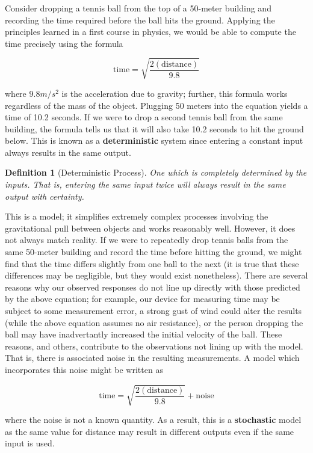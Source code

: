 \documentclass[
]{book}
\theoremstyle{plain}
\theoremstyle{mydefn}
\newtheorem{definition}{Definition}[chapter]
\theoremstyle{myexmpl}
\theoremstyle{remark}
\begin{document}
Consider dropping a tennis ball from the top of a 50-meter building and recording the time required before the ball hits the ground. Applying the principles learned in a first course in physics, we would be able to compute the time precisely using the formula

\[\text{time} = \sqrt{\frac{2(\text{distance})}{9.8}}\]

where \(9.8 m/s^2\) is the acceleration due to gravity; further, this formula works regardless of the mass of the object. Plugging 50 meters into the equation yields a time of 10.2 seconds. If we were to drop a second tennis ball from the same building, the formula tells us that it will also take 10.2 seconds to hit the ground below. This is known as a \textbf{deterministic} system since entering a constant input always results in the same output.

\begin{definition}[Deterministic Process]
\protect\hypertarget{def:defn-deterministic-process}{}{\label{def:defn-deterministic-process} {} }One which is completely determined by the inputs. That is, entering the same input twice will always result in the same output with certainty.
\end{definition}

This is a model; it simplifies extremely complex processes involving the gravitational pull between objects and works reasonably well. However, it does not always match reality. If we were to repeatedly drop tennis balls from the same 50-meter building and record the time before hitting the ground, we might find that the time differs slightly from one ball to the next (it is true that these differences may be negligible, but they would exist nonetheless). There are several reasons why our observed responses do not line up directly with those predicted by the above equation; for example, our device for measuring time may be subject to some measurement error, a strong gust of wind could alter the results (while the above equation assumes no air resistance), or the person dropping the ball may have inadvertantly increased the initial velocity of the ball. These reasons, and others, contribute to the observations not lining up with the model. That is, there is associated noise in the resulting measurements. A model which incorporates this noise might be written as

\[\text{time} = \sqrt{\frac{2(\text{distance})}{9.8}} + \text{noise}\]

where the noise is not a known quantity. As a result, this is a \textbf{stochastic} model as the same value for distance may result in different outputs even if the same input is used.
\end{document}
